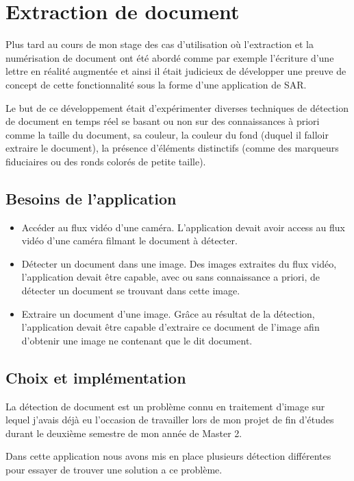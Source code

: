 \newpage
\section{Extraction de document}
\label{sec:document}
Plus tard au cours de mon stage des cas d'utilisation où l'extraction et la numérisation de document ont été abordé comme par exemple l'écriture d'une lettre en réalité augmentée et ainsi il était judicieux de développer une preuve de concept de cette fonctionnalité sous la forme d'une application de SAR.

Le but de ce développement était d'expérimenter diverses techniques de détection de document en temps réel se basant ou non sur des connaissances à priori comme la taille du document, sa couleur, la couleur du fond (duquel il falloir extraire le document), la présence d’éléments distinctifs (comme des marqueurs fiduciaires ou des ronds colorés de petite taille).

\subsection{Besoins de l'application}
\label{subsec:doc:content}
\begin{itemize}
\item Accéder au flux vidéo d'une caméra. L'application devait avoir access au flux vidéo d'une caméra filmant le document à détecter.
\item Détecter un document dans une image. Des images extraites du flux vidéo, l'application devait être capable, avec ou sans connaissance a priori, de détecter un document se trouvant dans cette image.
\item Extraire un document d'une image. Grâce au résultat de la détection, l'application devait être capable d'extraire ce document de l'image afin d'obtenir une image ne contenant que le dit document.
\end{itemize}

\subsection{Choix et implémentation}
\label{subsec:doc:impl}

La détection de document est un problème connu en traitement d'image sur lequel j'avais déjà eu l'occasion de travailler lors de mon projet de fin d'études durant le deuxième semestre de mon année de Master 2.

Dans cette application nous avons mis en place plusieurs détection différentes pour essayer de trouver une solution a ce problème.

